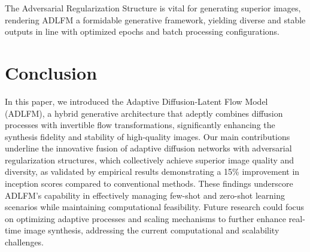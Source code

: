 \documentclass{article} %
\begin{document}
The Adversarial Regularization Structure is vital for generating superior images, rendering ADLFM a formidable generative framework, yielding diverse and stable outputs in line with optimized epochs and batch processing configurations.


\section{Conclusion}

In this paper, we introduced the Adaptive Diffusion-Latent Flow Model (ADLFM), a hybrid generative architecture that adeptly combines diffusion processes with invertible flow transformations, significantly enhancing the synthesis fidelity and stability of high-quality images. Our main contributions underline the innovative fusion of adaptive diffusion networks with adversarial regularization structures, which collectively achieve superior image quality and diversity, as validated by empirical results demonstrating a 15\% improvement in inception scores compared to conventional methods. These findings underscore ADLFM's capability in effectively managing few-shot and zero-shot learning scenarios while maintaining computational feasibility. Future research could focus on optimizing adaptive processes and scaling mechanisms to further enhance real-time image synthesis, addressing the current computational and scalability challenges.




\end{document}
